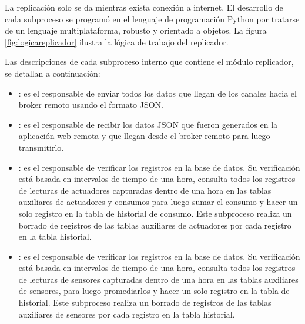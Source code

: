 La replicación solo se da mientras exista conexión a internet. El desarrollo de cada subproceso se programó en el lenguaje de programación Python por tratarse de un lenguaje multiplataforma, robusto y orientado a objetos. La figura \ref{fig:logicareplicador} ilustra la lógica de trabajo del replicador.





Las descripciones de cada subproceso interno que contiene el módulo replicador, se detallan a continuación: 

\begin{itemize}
\item {}: es el responsable de enviar todos los datos que llegan de los canales hacia el broker remoto usando el formato JSON.

\item {}: es el responsable de recibir los datos JSON que fueron generados en la aplicación web remota y que llegan desde el broker remoto para luego transmitirlo.

\item {}: es el responsable de verificar los registros en la base de datos. Su verificación está basada en intervalos de tiempo de una hora, consulta todos los registros de lecturas de actuadores capturadas dentro de una hora en las tablas auxiliares de actuadores y consumos para luego sumar el consumo y hacer un solo registro en la tabla de historial de consumo. Este subproceso realiza un borrado de registros de las tablas auxiliares de actuadores por cada registro en la tabla historial.

\item {}: es el responsable de verificar los registros en la base de datos. Su verificación está basada en intervalos de tiempo de una hora, consulta todos los registros de lecturas de sensores capturadas dentro de una hora en las tablas auxiliares de sensores, para luego promediarlos y hacer un solo registro en la tabla de historial. Este subproceso realiza un borrado de registros de las tablas auxiliares de sensores por cada registro en la tabla historial.


\end{itemize}
